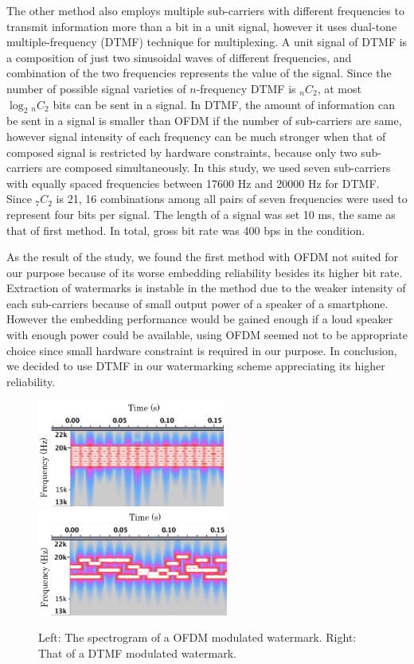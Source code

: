 The other method also employs multiple sub-carriers with different frequencies to transmit information more than a bit in a unit signal, however it uses dual-tone multiple-frequency (DTMF) technique for multiplexing.
A unit signal of DTMF is a composition of just two sinusoidal waves of different frequencies, and combination of the two frequencies represents the value of the signal.
Since the number of possible signal varieties of $n$-frequency DTMF is $_n C _2$, at most $\log_2 {}_n C _2$ bits can be sent in a signal.
In DTMF, the amount of information can be sent in a signal is smaller than OFDM if the number of sub-carriers are same, however signal intensity of each frequency can be much stronger when that of composed signal is restricted by hardware constraints, because only two sub-carriers are composed simultaneously.
In this study, we used seven sub-carriers with equally spaced frequencies between 17600 Hz and 20000 Hz for DTMF. Since $_7 C _2$ is 21, 16 combinations among all pairs of seven frequencies were used to represent four bits per signal.
The length of a signal was set 10 ms, the same as that of first method.
In total, gross bit rate was 400 bps in the condition.

As the result of the study, we found the first method with OFDM not suited for our purpose because of its worse embedding reliability besides its higher bit rate.
Extraction of watermarks is instable in the method due to the weaker intensity of each sub-carriers because of small output power of a speaker of a smartphone.
However the embedding performance would be gained enough if a loud speaker with enough power could be available, using OFDM seemed not to be appropriate choice since small hardware constraint is required in our purpose.
In conclusion, we decided to use DTMF in our watermarking scheme appreciating its higher reliability.

\begin{figure}[htbp]
 \begin{center}
  \includegraphics[height=35mm]{watermarking_ofdm.png}
  \hspace{5mm}
  \includegraphics[height=35mm]{watermarking_dtmf.png}
 \end{center}
 \caption{Left: The spectrogram of a OFDM modulated watermark. Right: That of a DTMF modulated watermark.}
 \label{fig:watr_spec}
\end{figure}
